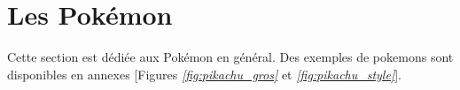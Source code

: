 \documentclass[../main.tex]{subfiles}
\begin{document}
\section{Les Pokémon}

Cette section est dédiée aux Pokémon en général. Des exemples de \glspl{pokemon} sont disponibles en annexes [Figures \emph{\ref{fig:pikachu_gros}} et \emph{\ref{fig:pikachu_style}}].
\end{document}
